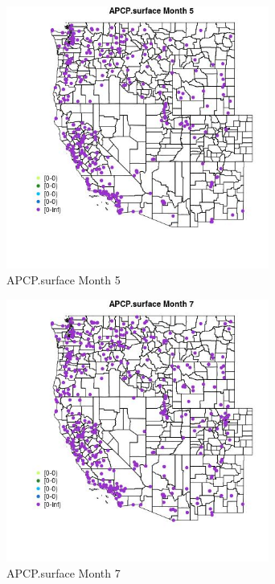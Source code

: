 \begin{figure} 
\centering  
\includegraphics[width=0.77\textwidth]{Code_Outputs/Report_ML_input_PM25_Step4_part_e_de_duplicated_aves_compiled_2019-05-18wNAs_MapObsMo5APCPsurface.jpg} 
\caption{\label{fig:Report_ML_input_PM25_Step4_part_e_de_duplicated_aves_compiled_2019-05-18wNAsMapObsMo5APCPsurface}APCP.surface Month 5} 
\end{figure} 
 

\clearpage 

\begin{figure} 
\centering  
\includegraphics[width=0.77\textwidth]{Code_Outputs/Report_ML_input_PM25_Step4_part_e_de_duplicated_aves_compiled_2019-05-18wNAs_MapObsMo7APCPsurface.jpg} 
\caption{\label{fig:Report_ML_input_PM25_Step4_part_e_de_duplicated_aves_compiled_2019-05-18wNAsMapObsMo7APCPsurface}APCP.surface Month 7} 
\end{figure} 
 

